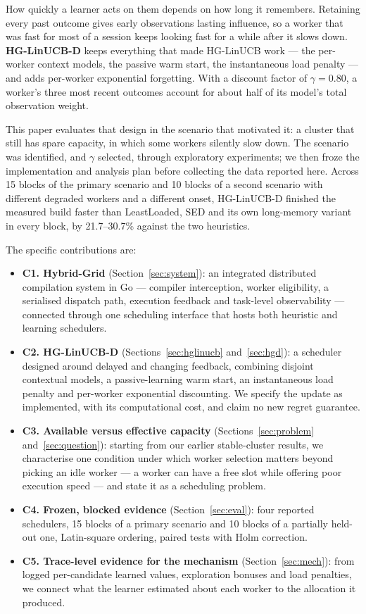 \documentclass[final,5p,times,twocolumn]{elsarticle}
\begin{document}
How quickly a learner acts on them depends on how long it remembers. Retaining every past outcome gives early observations lasting influence, so a worker that was fast for most of a session keeps looking fast for a while after it slows down. \textbf{HG-LinUCB-D} keeps everything that made HG-LinUCB work --- the per-worker context models, the passive warm start, the instantaneous load penalty --- and adds per-worker exponential forgetting. With a discount factor of $\gamma=0.80$, a worker's three most recent outcomes account for about half of its model's total observation weight.

This paper evaluates that design in the scenario that motivated it: a cluster that still has spare capacity, in which some workers silently slow down. The scenario was identified, and $\gamma$ selected, through exploratory experiments; we then froze the implementation and analysis plan before collecting the data reported here. Across 15 blocks of the primary scenario and 10 blocks of a second scenario with different degraded workers and a different onset, HG-LinUCB-D finished the measured build faster than LeastLoaded, SED and its own long-memory variant in every block, by 21.7--30.7\% against the two heuristics.

The specific contributions are:

\begin{itemize}
\item \textbf{C1. Hybrid-Grid} (Section~\ref{sec:system}): an integrated distributed compilation system in Go --- compiler interception, worker eligibility, a serialised dispatch path, execution feedback and task-level observability --- connected through one scheduling interface that hosts both heuristic and learning schedulers.
\item \textbf{C2. HG-LinUCB-D} (Sections~\ref{sec:hglinucb} and~\ref{sec:hgd}): a scheduler designed around delayed and changing feedback, combining disjoint contextual models, a passive-learning warm start, an instantaneous load penalty and per-worker exponential discounting. We specify the update as implemented, with its computational cost, and claim no new regret guarantee.
\item \textbf{C3. Available versus effective capacity} (Sections~\ref{sec:problem} and~\ref{sec:question}): starting from our earlier stable-cluster results, we characterise one condition under which worker selection matters beyond picking an idle worker --- a worker can have a free slot while offering poor execution speed --- and state it as a scheduling problem.
\item \textbf{C4. Frozen, blocked evidence} (Section~\ref{sec:eval}): four reported schedulers, 15 blocks of a primary scenario and 10 blocks of a partially held-out one, Latin-square ordering, paired tests with Holm correction.
\item \textbf{C5. Trace-level evidence for the mechanism} (Section~\ref{sec:mech}): from logged per-candidate learned values, exploration bonuses and load penalties, we connect what the learner estimated about each worker to the allocation it produced.
\end{itemize}
\end{document}
